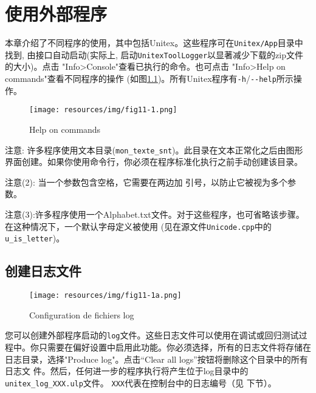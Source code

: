 
\chapter{使用外部程序}
\label{chap-external-programs}
本章介绍了不同程序的使用，其中包括Unitex。这些程序可在\verb+Unitex/App+目录中找到, 由接口自动启动(实际上, 启动\verb+UnitexToolLogger+以显著减少下载的zip文件的大小)。点击  "Info>Console"查看已执行的命令。也可点击 "Info>Help on commands"查看不同程序的操作 (如图\ref{fig-help})。所有Unitex程序有\verb$-h$/\verb$--help$所示操作。

\bigskip
\begin{figure}[!h]
\begin{center}
\texttt{[image: resources/img/fig11-1.png]}
\caption{Help on commands\label{fig-help}}
\end{center}
\end{figure}

\bigskip
\noindent 注意: 许多程序使用文本目录(\verb+mon_texte_snt+)。此目录在文本正常化之后由图形界面创建。如果你使用命令行，你必须在程序标准化执行之前手动创建该目录。

\bigskip
\noindent 注意(2): 当一个参数包含空格，它需要在两边加
引号，以防止它被视为多个参数。


\bigskip
\noindent 注意(3):许多程序使用一个Alphabet.txt文件。对于这些程序，也可省略该步骤。在这种情况下，一个默认字母定义被使用 (见在源文件\verb$Unicode.cpp$中的 \verb+u_is_letter+)。


\section{创建日志文件}
\label{section-creating-log-files}

\bigskip
\begin{figure}[!h]
\begin{center}
\texttt{[image: resources/img/fig11-1a.png]}
\caption{Configuration de fichiers log\label{fig-logging-config}}
\end{center}
\end{figure}


您可以创建外部程序启动的\verb+log+文件。这些日志文件可以使用在调试或回归测试过程中。你只需要在偏好设置中启用此功能。你必须选择，所有的日志文件将存储在日志目录，选择"Produce log"。点击“Clear all logs”按钮将删除这个目录中的所有日志文
件。然后，任何进一步的程序执行将产生位于log目录中的\verb+unitex_log_XXX.ulp+文件。 \verb+XXX+代表在控制台中的日志编号（见
下节）。





